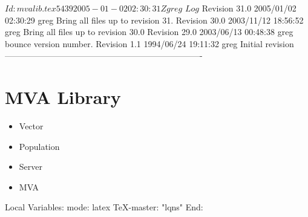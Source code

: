 \C 
\C $Id: mvalib.tex 5439 2005-01-02 02:30:31Z greg $
\C 
\C $Log$
\C Revision 31.0  2005/01/02 02:30:29  greg
\C Bring all files up to revision 31.
\C
\C Revision 30.0  2003/11/12 18:56:52  greg
\C Bring all files up to revision 30.0
\C
\C Revision 29.0  2003/06/13 00:48:38  greg
\C bounce version number.
\C
\C Revision 1.1  1994/06/24 19:11:32  greg
\C Initial revision
\C
\C
\C ----------------------------------------------------------------------
\chapter{MVA Library}

\begin{iftex}
\begin{itemize}
\item Vector
\item Population
\item Server
\item MVA
\end{itemize}
\end{iftex}





\C Local Variables: 
\C mode: latex
\C TeX-master: "lqns"
\C End: 
